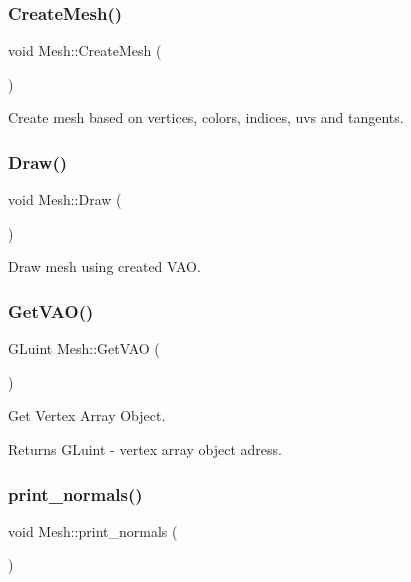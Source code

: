 \subsubsection{\texorpdfstring{CreateMesh()}{CreateMesh()}}
{\footnotesize\ttfamily void Mesh\+::\+Create\+Mesh (\begin{DoxyParamCaption}{ }\end{DoxyParamCaption})}



Create mesh based on vertices, colors, indices, uvs and tangents. 

\mbox{\label{class_mesh_afdd95c079fd0442afef8a6c421c8bfc9}} 
\subsubsection{\texorpdfstring{Draw()}{Draw()}}
{\footnotesize\ttfamily void Mesh\+::\+Draw (\begin{DoxyParamCaption}{ }\end{DoxyParamCaption})}



Draw mesh using created V\+AO. 

\mbox{\label{class_mesh_ad4917bc56c71f31974af4be3eb90a390}} 
\subsubsection{\texorpdfstring{GetVAO()}{GetVAO()}}
{\footnotesize\ttfamily G\+Luint Mesh\+::\+Get\+V\+AO (\begin{DoxyParamCaption}{ }\end{DoxyParamCaption})\hspace{0.3cm}{\ttfamily [inline]}}



Get Vertex Array Object. 

\begin{DoxyReturn}{Returns}
G\+Luint -\/ vertex array object adress. 
\end{DoxyReturn}
\mbox{\label{class_mesh_a0cf3f3f0bacd461a12ddff31acbdb6bf}} 
\subsubsection{\texorpdfstring{print\_normals()}{print\_normals()}}
{\footnotesize\ttfamily void Mesh\+::print\+\_\+normals (\begin{DoxyParamCaption}{ }\end{DoxyParamCaption})}

